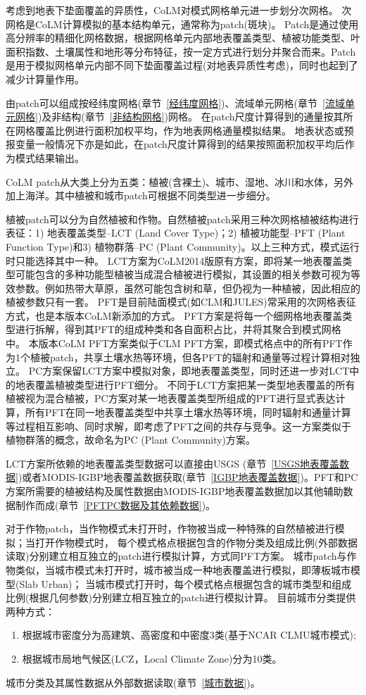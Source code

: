 考虑到地表下垫面覆盖的异质性，CoLM对模式网格单元进一步划分次网格。
次网格是CoLM计算模拟的基本结构单元，通常称为patch(斑块)。
Patch是通过使用高分辨率的精细化网格数据，根据网格单元内部地表覆盖类型、植被功能类型、叶面积指数、土壤属性和地形等分布特征，按一定方式进行划分并聚合而来。Patch是用于模拟网格单元内部不同下垫面覆盖过程(对地表异质性考虑)，同时也起到了减少计算量作用。


由patch可以组成按经纬度网格(章节~\ref{经纬度网格})、流域单元网格(章节~\ref{流域单元网格})及非结构(章节~\ref{非结构网格})网格。
在patch尺度计算得到的通量按其所在网格覆盖比例进行面积加权平均，作为地表网格通量模拟结果。
地表状态或预报变量一般情况下亦是如此，在patch尺度计算得到的结果按照面积加权平均后作为模式结果输出。


CoLM patch从大类上分为五类：植被(含裸土)、城市、湿地、冰川和水体，另外加上海洋。其中植被和城市patch可根据不同类型进一步细分。


植被patch可以分为自然植被和作物。自然植被patch采用三种次网格植被结构进行表征：1) 地表覆盖类型--LCT (Land Cover Type)；2) 植被功能型--PFT (Plant Function Type)和3) 植物群落--PC (Plant Community)。以上三种方式，模式运行时只能选择其中一种。
LCT方案为CoLM2014版原有方案，即将某一地表覆盖类型可能包含的多种功能型植被当成混合植被进行模拟，其设置的相关参数可视为等效参数。例如热带大草原，虽然可能包含树和草，但仍视为一种植被，因此相应的植被参数只有一套。
PFT是目前陆面模式(如CLM和JULES)常采用的次网格表征方式，也是本版本CoLM新添加的方式。
PFT方案是将每一个细网格地表覆盖类型进行拆解，得到其PFT的组成种类和各自面积占比，并将其聚合到模式网格中。
本版本CoLM PFT方案类似于CLM PFT方案，即模式格点中的所有PFT作为1个植被patch，共享土壤水热等环境，但各PFT的辐射和通量等过程计算相对独立。
PC方案保留LCT方案中模拟对象，即地表覆盖类型，同时还进一步对LCT中的地表覆盖植被类型进行PFT细分。
不同于LCT方案把某一类型地表覆盖的所有植被视为混合植被，PC方案对某一地表覆盖类型所组成的PFT进行显式表达计算，所有PFT在同一地表覆盖类型中共享土壤水热等环境，同时辐射和通量计算等过程相互影响、同时求解，即考虑了PFT之间的共存与竞争。这一方案类似于植物群落的概念，故命名为PC (Plant Community)方案。


LCT方案所依赖的地表覆盖类型数据可以直接由USGS (章节~\ref{USGS地表覆盖数据})或者MODIS-IGBP地表覆盖数据获取(章节~\ref{IGBP地表覆盖数据})。PFT和PC方案所需要的植被结构及属性数据由MODIS-IGBP地表覆盖数据加以其他辅助数据制作而成(章节~\ref{PFTPC数据及其依赖数据})。


对于作物patch，当作物模式未打开时，作物被当成一种特殊的自然植被进行模拟；当打开作物模式时，
每个模式格点根据包含的作物分类及组成比例(外部数据读取)分别建立相互独立的patch进行模拟计算，方式同PFT方案。
城市patch与作物类似，当城市模式未打开时，城市被当成一种地表覆盖进行模拟，即薄板城市模型(Slab Urban)；
当城市模式打开时，每个模式格点根据包含的城市类型和组成比例(根据几何参数)分别建立相互独立的patch进行模拟计算。
目前城市分类提供两种方式：
\begin{enumerate}
    \item 根据城市密度分为高建筑、高密度和中密度3类(基于NCAR CLMU城市模式);
    \item 根据城市局地气候区(LCZ，Local Climate Zone)分为10类。
\end{enumerate}
城市分类及其属性数据从外部数据读取(章节~\ref{城市数据})。

